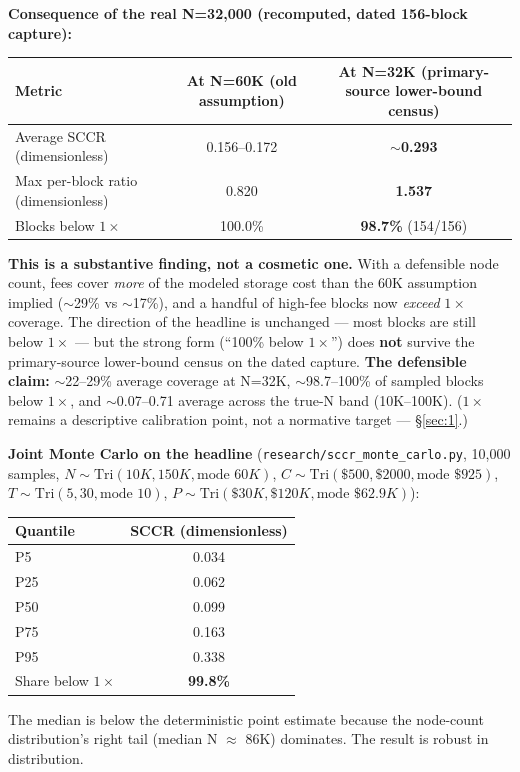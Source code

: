 \documentclass[11pt]{article}
\begin{document}
\textbf{Consequence of the real N=32{,}000 (recomputed, dated 156-block capture):}
\begin{center}
\begin{tabular}{lcc}
\toprule
Metric & At N=60K (old assumption) & At N=32K (primary-source lower-bound census) \\
\midrule
Average SCCR (dimensionless) & 0.156--0.172 & \textbf{$\sim$0.293} \\
Max per-block ratio (dimensionless) & 0.820 & \textbf{1.537} \\
Blocks below $1\times$ & 100.0\% & \textbf{98.7\%} (154/156) \\
\bottomrule
\end{tabular}
\end{center}
\textbf{This is a substantive finding, not a cosmetic one.} With a defensible node count, fees cover \emph{more} of the modeled storage cost than the 60K assumption implied ($\sim$29\% vs $\sim$17\%), and a handful of high-fee blocks now \emph{exceed} $1\times$ coverage. The direction of the headline is unchanged --- most blocks are still below $1\times$ --- but the strong form (``100\% below $1\times$'') does \textbf{not} survive the primary-source lower-bound census on the dated capture. \textbf{The defensible claim:} $\sim$22--29\% average coverage at N=32K, $\sim$98.7--100\% of sampled blocks below $1\times$, and $\sim$0.07--0.71 average across the true-N band (10K--100K). ($1\times$ remains a descriptive calibration point, not a normative target --- \S\ref{sec:1}.)

\textbf{Joint Monte Carlo on the headline} (\texttt{research/sccr\_monte\_carlo.py}, 10{,}000 samples, $N \sim \mathrm{Tri}(10K,150K,\text{mode }60K)$, $C \sim \mathrm{Tri}(\$500,\$2000,\text{mode }\$925)$, $T \sim \mathrm{Tri}(5,30,\text{mode }10)$, $P \sim \mathrm{Tri}(\$30K,\$120K,\text{mode }\$62.9K)$):
\begin{center}
\begin{tabular}{lc}
\toprule
Quantile & SCCR (dimensionless) \\
\midrule
P5 & 0.034 \\
P25 & 0.062 \\
P50 & 0.099 \\
P75 & 0.163 \\
P95 & 0.338 \\
Share below $1\times$ & \textbf{99.8\%} \\
\bottomrule
\end{tabular}
\end{center}
The median is below the deterministic point estimate because the node-count distribution's right tail (median N $\approx$ 86K) dominates. The result is robust in distribution.
\end{document}
